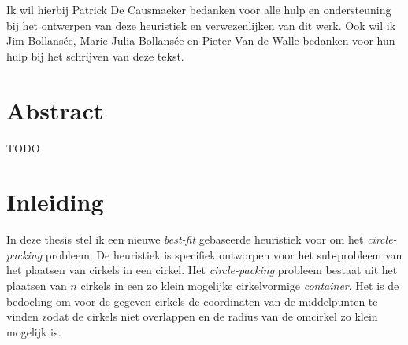 \documentclass[12pt,a4paper,oneside]{book}
\begin{document}
Ik wil hierbij Patrick De Causmaeker bedanken voor alle hulp en ondersteuning bij het ontwerpen van deze heuristiek en verwezenlijken van dit werk.
Ook wil ik Jim Bollansée, Marie Julia Bollansée en Pieter Van de Walle bedanken voor hun hulp bij het schrijven van deze tekst.


\newpage

\chapter*{Abstract}

TODO


\newpage

\tableofcontents
\listoffigures
{}
\listoftables
{}

\newpage

\setcounter{page}{0}

\chapter{Inleiding}

In deze thesis stel ik een nieuwe \textit{best-fit} gebaseerde heuristiek voor om het \textit{circle-packing} probleem.
De heuristiek is specifiek ontworpen voor het sub-probleem van het plaatsen van cirkels in een cirkel.
Het \textit{circle-packing} probleem bestaat uit het plaatsen van $n$ cirkels in een zo klein mogelijke cirkelvormige \textit{container}.
Het is de bedoeling om voor de gegeven cirkels de coordinaten van de middelpunten te vinden zodat de cirkels niet overlappen en de radius van de omcirkel zo klein mogelijk is.
\end{document}
